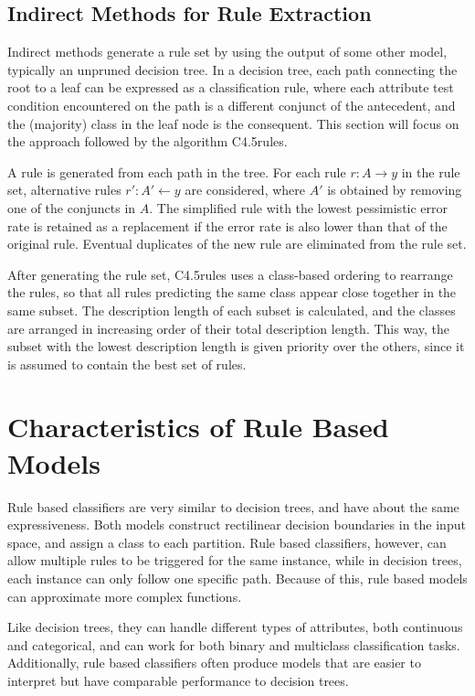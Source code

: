 \subsection{Indirect Methods for Rule Extraction}

Indirect methods generate a rule set by using the output of some other model, typically an unpruned decision tree. In a decision tree, each path connecting the root to a leaf can be expressed as a classification rule, where each attribute test condition encountered on the path is a different conjunct of the antecedent, and the (majority) class in the leaf node is the consequent. This section will focus on the approach followed by the algorithm C4.5rules.

A rule is generated from each path in the tree. For each rule $r : A \xrightarrow{} y$ in the rule set, alternative rules $r' : A' \xleftarrow{} y$ are considered, where $A'$ is obtained by removing one of the conjuncts in $A$. The simplified rule with the lowest pessimistic error rate is retained as a replacement if the error rate is also lower than that of the original rule. Eventual duplicates of the new rule are eliminated from the rule set.

After generating the rule set, C4.5rules uses a class-based ordering to rearrange the rules, so that all rules predicting the same class appear close together in the same subset. The description length of each subset is calculated, and the classes are arranged in increasing order of their total description length. This way, the subset with the lowest description length is given priority over the others, since it is assumed to contain the best set of rules.

\section{Characteristics of Rule Based Models}

Rule based classifiers are very similar to decision trees, and have about the same expressiveness. Both models construct rectilinear decision boundaries in the input space, and assign a class to each partition. Rule based classifiers, however, can allow multiple rules to be triggered for the same instance, while in decision trees, each instance can only follow one specific path. Because of this, rule based models can approximate more complex functions.

Like decision trees, they can handle different types of attributes, both continuous and categorical, and can work for both binary and multiclass classification tasks. Additionally, rule based classifiers often produce models that are easier to interpret but have comparable performance to decision trees.

